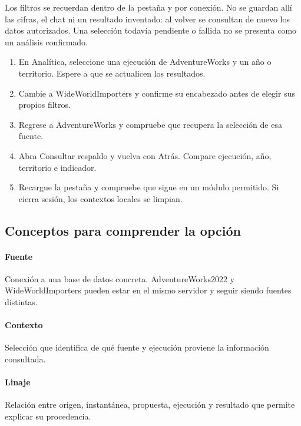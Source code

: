 Los filtros se recuerdan dentro de la pestaña y por conexión. No se guardan allí las cifras, el chat ni un resultado inventado: al volver se consultan de nuevo los datos autorizados. Una selección todavía pendiente o fallida no se presenta como un análisis confirmado.

\begin{enumerate}
\item En Analítica, seleccione una ejecución de AdventureWorks y un año o territorio. Espere a que se actualicen los resultados.
\item Cambie a WideWorldImporters y confirme su encabezado antes de elegir sus propios filtros.
\item Regrese a AdventureWorks y compruebe que recupera la selección de esa fuente.
\item Abra Consultar respaldo y vuelva con Atrás. Compare ejecución, año, territorio e indicador.
\item Recargue la pestaña y compruebe que sigue en un módulo permitido. Si cierra sesión, los contextos locales se limpian.
\end{enumerate}

\subsection{Conceptos para comprender la opción}
\paragraph{Fuente} Conexión a una base de datos concreta. AdventureWorks2022 y WideWorldImporters pueden estar en el mismo servidor y seguir siendo fuentes distintas.

\paragraph{Contexto} Selección que identifica de qué fuente y ejecución proviene la información consultada.

\paragraph{Linaje} Relación entre origen, instantánea, propuesta, ejecución y resultado que permite explicar su procedencia.

